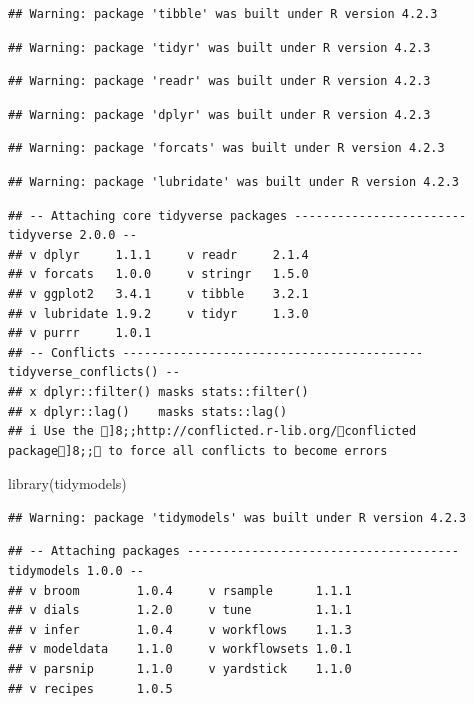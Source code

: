 \documentclass[
]{article}
\newenvironment{Shaded}{\begin{snugshade}}{\end{snugshade}}
\newcommand{\FunctionTok}[1]{\textcolor[rgb]{0.00,0.00,0.00}{#1}}
\newcommand{\NormalTok}[1]{#1}
\begin{document}
\begin{verbatim}
## Warning: package 'tibble' was built under R version 4.2.3
\end{verbatim}

\begin{verbatim}
## Warning: package 'tidyr' was built under R version 4.2.3
\end{verbatim}

\begin{verbatim}
## Warning: package 'readr' was built under R version 4.2.3
\end{verbatim}

\begin{verbatim}
## Warning: package 'dplyr' was built under R version 4.2.3
\end{verbatim}

\begin{verbatim}
## Warning: package 'forcats' was built under R version 4.2.3
\end{verbatim}

\begin{verbatim}
## Warning: package 'lubridate' was built under R version 4.2.3
\end{verbatim}

\begin{verbatim}
## -- Attaching core tidyverse packages ------------------------ tidyverse 2.0.0 --
## v dplyr     1.1.1     v readr     2.1.4
## v forcats   1.0.0     v stringr   1.5.0
## v ggplot2   3.4.1     v tibble    3.2.1
## v lubridate 1.9.2     v tidyr     1.3.0
## v purrr     1.0.1     
## -- Conflicts ------------------------------------------ tidyverse_conflicts() --
## x dplyr::filter() masks stats::filter()
## x dplyr::lag()    masks stats::lag()
## i Use the ]8;;http://conflicted.r-lib.org/conflicted package]8;; to force all conflicts to become errors
\end{verbatim}

\begin{Shaded}
\begin{Highlighting}[]
\FunctionTok{library}\NormalTok{(tidymodels)}
\end{Highlighting}
\end{Shaded}

\begin{verbatim}
## Warning: package 'tidymodels' was built under R version 4.2.3
\end{verbatim}

\begin{verbatim}
## -- Attaching packages -------------------------------------- tidymodels 1.0.0 --
## v broom        1.0.4     v rsample      1.1.1
## v dials        1.2.0     v tune         1.1.1
## v infer        1.0.4     v workflows    1.1.3
## v modeldata    1.1.0     v workflowsets 1.0.1
## v parsnip      1.1.0     v yardstick    1.1.0
## v recipes      1.0.5
\end{verbatim}
\end{document}
